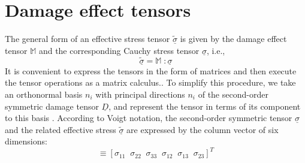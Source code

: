 \documentclass[12pt,a4paper,twoside,openright]{report}
\begin{document}
\section{Damage effect tensors}\label{Matrix Representation of Damage effect tensors}
\indent\indent\indent The general form of an effective stress tensor $\underline{\tilde{\sigma}}$ is given by the damage effect tensor $\mathbb{M}$ and the corresponding Cauchy stress tensor $\underline{\sigma}$, i.e.,
\begin{equation}
\underline{\tilde{\sigma}}  = \mathbb{M} \; :  \underline{\sigma}
\label{eqn:effective_stress_tensor} 
\end{equation}
It is convenient to express the tensors in the form of matrices and then execute the tensor operations as a matrix calculus.. To simplify this procedure, we take an orthonormal basis ${n_{i}}$ with principal directions $n_{i}$ of the second-order symmetric damage tensor $\underline{D}$, and represent the tensor in terms of its component to this basis \citep{murakami2012continuum}. According to Voigt notation, the second-order symmetric tensor $\underline{\sigma}$ and the related effective stress $\underline{\tilde{\sigma}}$ are expressed by the column vector of six dimensions:
\begin{equation}
   [\sigma_{P}]  \equiv  [\sigma_{11} \;\; \sigma_{22} \;\;\sigma_{33} \;\;\sigma_{12} \;\;\sigma_{13} \;\;\sigma_{23} ]^{T}
\end{equation}
\end{document}
